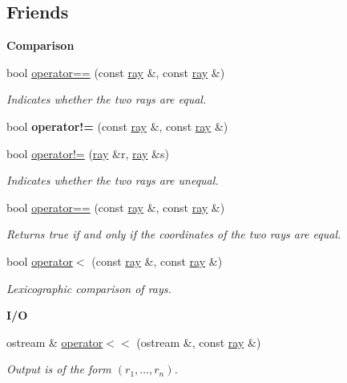 \subsection*{Friends}
\begin{Indent}\textbf{ Comparison}\par
\begin{DoxyCompactItemize}
\item 
bool \hyperlink{classray_ae27bf49e1b2756797f82fea0bf810dfd}{operator==} (const \hyperlink{classray}{ray} \&, const \hyperlink{classray}{ray} \&)
\begin{DoxyCompactList}\small\item\em Indicates whether the two rays are equal. \end{DoxyCompactList}\item 
\mbox{\label{classray_a22b7d226858aa935e739c696065e4680}} 
bool {\bfseries operator!=} (const \hyperlink{classray}{ray} \&, const \hyperlink{classray}{ray} \&)
\item 
bool \hyperlink{classray_a088bbdf2a6fc03509fc660aa3aee110e}{operator!=} (\hyperlink{classray}{ray} \&r, \hyperlink{classray}{ray} \&s)
\begin{DoxyCompactList}\small\item\em Indicates whether the two rays are unequal. \end{DoxyCompactList}\item 
bool \hyperlink{classray_ae27bf49e1b2756797f82fea0bf810dfd}{operator==} (const \hyperlink{classray}{ray} \&, const \hyperlink{classray}{ray} \&)
\begin{DoxyCompactList}\small\item\em Returns {\ttfamily true} if and only if the coordinates of the two rays are equal. \end{DoxyCompactList}\item 
bool \hyperlink{classray_a5909f048e7cf014f880adb43da3862d3}{operator$<$} (const \hyperlink{classray}{ray} \&, const \hyperlink{classray}{ray} \&)
\begin{DoxyCompactList}\small\item\em Lexicographic comparison of rays. \end{DoxyCompactList}\end{DoxyCompactItemize}
\end{Indent}
\begin{Indent}\textbf{ I/O}\par
\begin{DoxyCompactItemize}
\item 
\mbox{\label{classray_a1fa347ed00fc99eec663252c28108a3f}} 
ostream \& \hyperlink{classray_a1fa347ed00fc99eec663252c28108a3f}{operator$<$$<$} (ostream \&, const \hyperlink{classray}{ray} \&)
\begin{DoxyCompactList}\small\item\em Output is of the form $(r_1, \ldots, r_n)$. \end{DoxyCompactList}\end{DoxyCompactItemize}
\end{Indent}


